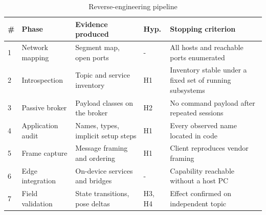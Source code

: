 \begin{table}[!t]
\caption{Reverse-engineering pipeline}
\label{tab:phases}
\centering
\scriptsize
\setlength{\tabcolsep}{3pt}
\begin{tabular}{@{}p{0.15cm}p{1.25cm}p{2.35cm}p{0.5cm}p{2.15cm}@{}}
\toprule
\textbf{\#} & \textbf{Phase} & \textbf{Evidence produced} & \textbf{Hyp.} & \textbf{Stopping criterion} \\
\midrule
1 & Network mapping & Segment map, open ports & - & All hosts and reachable ports enumerated \\
2 & Introspection & Topic and service inventory & H1 & Inventory stable under a fixed set of running subsystems \\
3 & Passive broker & Payload classes on the broker & H2 & No command payload after repeated sessions \\
4 & Application audit & Names, types, implicit setup steps & H1 & Every observed name located in code \\
5 & Frame capture & Message framing and ordering & H1 & Client reproduces vendor framing \\
6 & Edge integration & On-device services and bridges & - & Capability reachable without a host PC \\
7 & Field validation & State transitions, pose deltas & H3, H4 & Effect confirmed on independent topic \\
\bottomrule
\end{tabular}
\end{table}
